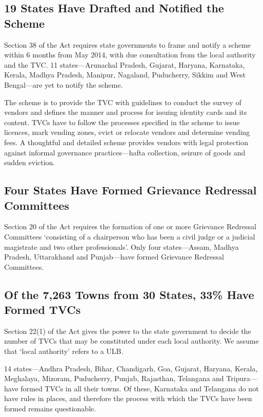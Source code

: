 \documentclass[a4paper, 12pt, twoside]{article}
\begin{document}
{\subsection*{19 States Have Drafted and Notified the Scheme}
	Section 38 of the Act requires state governments to frame and notify a scheme within 6 months from May 2014, with due consultation from the local authority and the TVC. 11 states—Arunachal Pradesh, Gujarat, Haryana, Karnataka, Kerala, Madhya Pradesh, Manipur, Nagaland, Puducherry, Sikkim and West Bengal—are yet to notify the scheme.

	The scheme is to provide the TVC with guidelines to conduct the survey of vendors and defines the manner and process for issuing identity cards and its content. TVCs have to follow the processes specified in the scheme to issue licences, mark vending zones, evict or relocate vendors and determine vending fees. A thoughtful and detailed scheme provides vendors with legal protection against informal governance practices—hafta collection, seizure of goods and sudden eviction.

\subsection*{Four States Have Formed Grievance Redressal Committees}
	Section 20 of the Act requires the formation of one or more Grievance Redressal Committees `consisting of a chairperson who has been a civil judge or a judicial magistrate and two other professionals'. Only four states—Assam, Madhya Pradesh, Uttarakhand and Punjab—have formed Grievance Redressal Committees.

\subsection*{Of the 7,263 Towns from 30 States, 33\% Have Formed TVCs}
	Section 22(1) of the Act gives the power to the state government to decide the number of TVCs that may be constituted under each local authority. We assume that ‘local authority’ refers to a ULB.

	14 states—Andhra Pradesh, Bihar, Chandigarh, Goa, Gujarat, Haryana, Kerala, Meghalaya, Mizoram, Puducherry, Punjab, Rajasthan, Telangana and Tripura—have formed TVCs in all their towns. Of these, Karnataka and Telangana do not have rules in places, and therefore the process with which the TVCs have been formed remains questionable.

}
\end{document}
